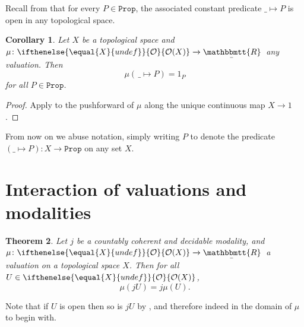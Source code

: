 \documentclass[reqno,11pt]{amsproc}
\theoremstyle{plain}
\newtheorem{theorem}{Theorem}[section]
\newtheorem{corollary}[theorem]{Corollary}
\theoremstyle{definition}
\newcommand{\Const}[1]{\mathtt{#1}}
\renewcommand{\to}[1][]{\xrightarrow{#1}}
\newcommand{\ubar}[1]{\underaccent{\bar}{#1}}
\newcommand{\ind}[1]{1_{#1}}			%
\newcommand{\internal}[1]{\raisebox{-.03ex}{$\mathbbmtt{#1}$}}
\newcommand{\hs}{\hspace{1pt}}
\newcommand{\trr}{\internal{R}}
\newcommand{\tlrr}{\ubar{\trr}\hs}
\newcommand{\prop}{\Const{Prop}}
\newcommand{\Op}[1][undef]{\ifthenelse{\equal{#1}{undef}}{\mathcal{O}}{\mathcal{O}(#1)}}
\numberwithin{equation}{section}
\begin{document}
Recall from  that for every $P \in \prop$, the associated constant predicate $\_ \mapsto P$ is open in any topological space.

\begin{corollary}\label{cor.val_const_indicator}
	Let $X$ be a topological space and $\mu \colon \Op[X] \to \tlrr$ any valuation. Then
	\[
		\mu(\,\_\mapsto P) = \ind{P}
	\]
	for all $P \in \prop$.
\end{corollary}

\begin{proof}
	Apply  to the pushforward of $\mu$ along the unique continuous map $X\to 1$.
\end{proof}

From now on we abuse notation, simply writing $P$ to denote the predicate $(\_\mapsto P)\colon X\to\prop$ on any set $X$.

\section{Interaction of valuations and modalities}

\begin{theorem}
	\label{vals_vs_modalities}
	Let $j$ be a countably coherent and decidable modality, and $\mu \colon \Op[X] \to \tlrr$ a valuation on a topological space $X$. Then for all $U \in \Op[X]$,
	\[
		\mu(jU) = j \mu(U).	
	\]
\end{theorem}

Note that if $U$ is open then so is $jU$ by , and therefore indeed in the domain of $\mu$ to begin with.
\end{document}
